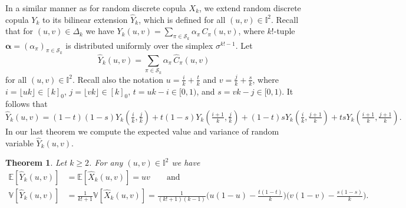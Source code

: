 \documentclass[12pt,a4paper]{amsart}
\newtheorem{theorem}{Theorem}[section]
\theoremstyle{definition}
\newcommand{\II}{\mathbb{I}}
\newcommand{\DK}{\Delta_k}
\newcommand{\SK}{\mathcal{S}_k}
\newcommand{\Chat}{\widehat{C}}
\newcommand{\Xhat}{\widehat{X}}
\newcommand{\Yhat}{\widehat{Y}}
\newcommand{\EE}{\mathbb{E}}
\newcommand{\VV}{\mathbb{V}}
\newcommand{\aaa}{\boldsymbol{\alpha}}
\begin{document}
In a similar manner as for random discrete copula $X_k$, we extend random discrete copula $Y_k$ to its bilinear extension $\Yhat_k$, which is defined for all $(u,v) \in \II^2$.
Recall that for $(u,v) \in \DK$ we have $Y_k(u,v)= \sum_{\pi \in \SK} \alpha_\pi \, C_{\pi}(u,v)$, where $k!$-tuple $\aaa=(\alpha_\pi)_{\pi \in \SK}$ is distributed uniformly over the simplex $\sigma^{k!-1}$.
Let $$\Yhat_k(u,v)= \sum_{\pi \in \SK} \alpha_{\pi} \, \Chat_{\pi}(u,v)$$
for all $(u,v) \in \II^2$.
Recall also the notation $u = \tfrac{i}{k} + \tfrac{t}{k}$ and $v = \tfrac{j}{k} + \tfrac{s}{k}$,
where $i=\lfloor uk \rfloor \in [k]_0$, $j=\lfloor vk \rfloor \in [k]_0$, $t = uk -i \in [0,1)$, and $s = vk -j \in [0,1)$. It follows that
$$\Yhat_k(u,v) = (1-t)(1-s)Y_k(\tfrac{i}{k},\tfrac{j}{k}) + t(1-s)Y_k(\tfrac{i+1}{k},\tfrac{j}{k}) + (1-t)sY_k(\tfrac{i}{k},\tfrac{j+1}{k}) +tsY_k(\tfrac{i+1}{k},\tfrac{j+1}{k}).$$
In our last theorem we compute the expected value and variance of random variable $\Yhat_k(u,v)$.

\begin{theorem}\label{th:eyk_hat}
    Let $k\ge 2$. For any $(u,v) \in \II^2$ we have 
    \begin{align*}
    \EE[\Yhat_k(u,v)] &=\EE[\Xhat_k(u,v)]= uv \qquad\text{and}\\
    \VV[\Yhat_k(u,v)] &=\frac{1}{k!+1}\VV[\Xhat_k(u,v)] = \frac{1}{(k!+1)(k-1)}\Big(u(1-u)-\frac{t(1-t)}{k}\Big)\Big(v(1-v)-\frac{s(1-s)}{k}\Big).
    \end{align*}
\end{theorem}
\end{document}
